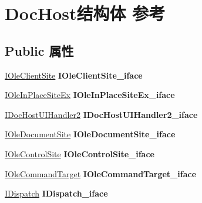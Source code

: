\hypertarget{struct_doc_host}{}\section{Doc\+Host结构体 参考}
\label{struct_doc_host}
\subsection*{Public 属性}
\begin{DoxyCompactItemize}
\item 
\mbox{\label{struct_doc_host_a74cf220f786a91b37810fa030851a3b5}} 
\hyperlink{interface_i_ole_client_site}{I\+Ole\+Client\+Site} {\bfseries I\+Ole\+Client\+Site\+\_\+iface}
\item 
\mbox{\label{struct_doc_host_aa50eca9451eff3cfcacc7f2d3f17b028}} 
\hyperlink{interface_i_ole_in_place_site_ex}{I\+Ole\+In\+Place\+Site\+Ex} {\bfseries I\+Ole\+In\+Place\+Site\+Ex\+\_\+iface}
\item 
\mbox{\label{struct_doc_host_ac10ca72353470c527016c9f1bbb4dd03}} 
\hyperlink{interface_i_doc_host_u_i_handler2}{I\+Doc\+Host\+U\+I\+Handler2} {\bfseries I\+Doc\+Host\+U\+I\+Handler2\+\_\+iface}
\item 
\mbox{\label{struct_doc_host_abd1511cc66a0ac31d49a96ced8609322}} 
\hyperlink{interface_i_ole_document_site}{I\+Ole\+Document\+Site} {\bfseries I\+Ole\+Document\+Site\+\_\+iface}
\item 
\mbox{\label{struct_doc_host_ab45d44c18c644962cc761799dde9b57f}} 
\hyperlink{interface_i_ole_control_site}{I\+Ole\+Control\+Site} {\bfseries I\+Ole\+Control\+Site\+\_\+iface}
\item 
\mbox{\label{struct_doc_host_a630a0a628b1de3d8832d6df91105976e}} 
\hyperlink{interface_i_ole_command_target}{I\+Ole\+Command\+Target} {\bfseries I\+Ole\+Command\+Target\+\_\+iface}
\item 
\mbox{\label{struct_doc_host_a7136faa2fef9a533fd3614704cdd71f2}} 
\hyperlink{interface_i_dispatch}{I\+Dispatch} {\bfseries I\+Dispatch\+\_\+iface}
\item 
\mbox{\label{struct_doc_host_a88c726c6f48fc01ca9c9b6649190e0a3}} 

\end{DoxyCompactItemize}
